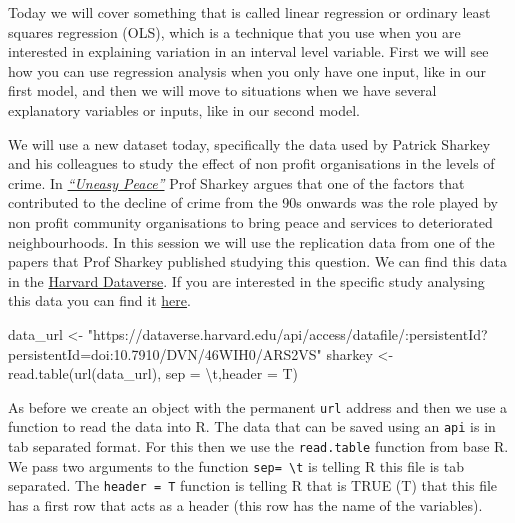 \documentclass[
]{book}
\newenvironment{Shaded}{\begin{snugshade}}{\end{snugshade}}
\newcommand{\AttributeTok}[1]{\textcolor[rgb]{0.77,0.63,0.00}{#1}}
\newcommand{\FunctionTok}[1]{\textcolor[rgb]{0.00,0.00,0.00}{#1}}
\newcommand{\NormalTok}[1]{#1}
\newcommand{\OtherTok}[1]{\textcolor[rgb]{0.56,0.35,0.01}{#1}}
\newcommand{\SpecialCharTok}[1]{\textcolor[rgb]{0.00,0.00,0.00}{#1}}
\newcommand{\StringTok}[1]{\textcolor[rgb]{0.31,0.60,0.02}{#1}}
\begin{document}
Today we will cover something that is called linear regression or ordinary least squares regression (OLS), which is a technique that you use when you are interested in explaining variation in an interval level variable. First we will see how you can use regression analysis when you only have one input, like in our first model, and then we will move to situations when we have several explanatory variables or inputs, like in our second model.

We will use a new dataset today, specifically the data used by Patrick Sharkey and his colleagues to study the effect of non profit organisations in the levels of crime. In \href{https://books.wwnorton.com/books/Uneasy-Peace/}{\emph{``Uneasy Peace''}} Prof Sharkey argues that one of the factors that contributed to the decline of crime from the 90s onwards was the role played by non profit community organisations to bring peace and services to deteriorated neighbourhoods. In this session we will use the replication data from one of the papers that Prof Sharkey published studying this question. We can find this data in the \href{https://dataverse.harvard.edu/dataset.xhtml?persistentId=doi:10.7910/DVN/46WIH0}{Harvard Dataverse}. If you are interested in the specific study analysing this data you can find it \href{https://journals.sagepub.com/doi/abs/10.1177/0003122417736289}{here}.

\begin{Shaded}
\begin{Highlighting}[]
\NormalTok{data\_url }\OtherTok{\textless{}{-}} \StringTok{"https://dataverse.harvard.edu/api/access/datafile/:persistentId?persistentId=doi:10.7910/DVN/46WIH0/ARS2VS"}
\NormalTok{sharkey }\OtherTok{\textless{}{-}} \FunctionTok{read.table}\NormalTok{(}\FunctionTok{url}\NormalTok{(data\_url), }\AttributeTok{sep =} \StringTok{\textquotesingle{}}\SpecialCharTok{\textbackslash{}t}\StringTok{\textquotesingle{}}\NormalTok{,}\AttributeTok{header =}\NormalTok{ T)}
\end{Highlighting}
\end{Shaded}

As before we create an object with the permanent \texttt{url} address and then we use a function to read the data into R. The data that can be saved using an \texttt{api} is in tab separated format. For this then we use the \texttt{read.table} function from base R. We pass two arguments to the function \texttt{sep=\ \textquotesingle{}\textbackslash{}t\textquotesingle{}} is telling R this file is tab separated. The \texttt{header\ =\ T} function is telling R that is TRUE (T) that this file has a first row that acts as a header (this row has the name of the variables).
\end{document}
